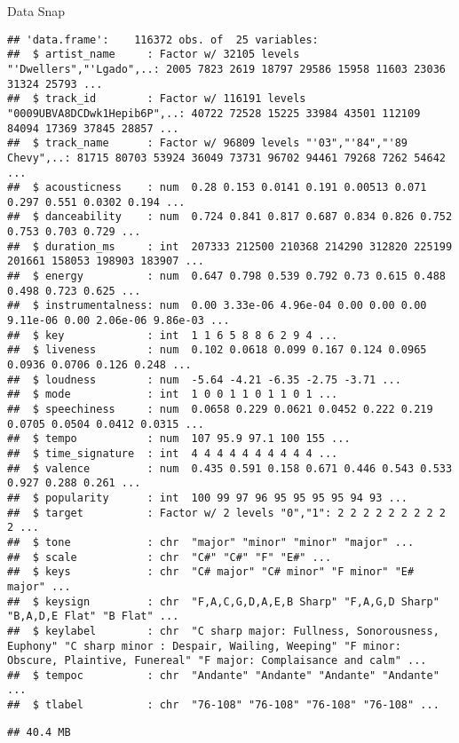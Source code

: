 \documentclass[ignorenonframetext,]{beamer}
\begin{document}
\begin{frame}[fragile]{Data Snap}
\protect\hypertarget{data-snap}{}

\begin{verbatim}
## 'data.frame':    116372 obs. of  25 variables:
##  $ artist_name     : Factor w/ 32105 levels "'Dwellers","'Lgado",..: 2005 7823 2619 18797 29586 15958 11603 23036 31324 25793 ...
##  $ track_id        : Factor w/ 116191 levels "0009UBVA8DCDwk1Hepib6P",..: 40722 72528 15225 33984 43501 112109 84094 17369 37845 28857 ...
##  $ track_name      : Factor w/ 96809 levels "'03","'84","'89 Chevy",..: 81715 80703 53924 36049 73731 96702 94461 79268 7262 54642 ...
##  $ acousticness    : num  0.28 0.153 0.0141 0.191 0.00513 0.071 0.297 0.551 0.0302 0.194 ...
##  $ danceability    : num  0.724 0.841 0.817 0.687 0.834 0.826 0.752 0.753 0.703 0.729 ...
##  $ duration_ms     : int  207333 212500 210368 214290 312820 225199 201661 158053 198903 183907 ...
##  $ energy          : num  0.647 0.798 0.539 0.792 0.73 0.615 0.488 0.498 0.723 0.625 ...
##  $ instrumentalness: num  0.00 3.33e-06 4.96e-04 0.00 0.00 0.00 9.11e-06 0.00 2.06e-06 9.86e-03 ...
##  $ key             : int  1 1 6 5 8 8 6 2 9 4 ...
##  $ liveness        : num  0.102 0.0618 0.099 0.167 0.124 0.0965 0.0936 0.0706 0.126 0.248 ...
##  $ loudness        : num  -5.64 -4.21 -6.35 -2.75 -3.71 ...
##  $ mode            : int  1 0 0 1 1 0 1 1 0 1 ...
##  $ speechiness     : num  0.0658 0.229 0.0621 0.0452 0.222 0.219 0.0705 0.0504 0.0412 0.0315 ...
##  $ tempo           : num  107 95.9 97.1 100 155 ...
##  $ time_signature  : int  4 4 4 4 4 4 4 4 4 4 ...
##  $ valence         : num  0.435 0.591 0.158 0.671 0.446 0.543 0.533 0.927 0.288 0.261 ...
##  $ popularity      : int  100 99 97 96 95 95 95 95 94 93 ...
##  $ target          : Factor w/ 2 levels "0","1": 2 2 2 2 2 2 2 2 2 2 ...
##  $ tone            : chr  "major" "minor" "minor" "major" ...
##  $ scale           : chr  "C#" "C#" "F" "E#" ...
##  $ keys            : chr  "C# major" "C# minor" "F minor" "E# major" ...
##  $ keysign         : chr  "F,A,C,G,D,A,E,B Sharp" "F,A,G,D Sharp" "B,A,D,E Flat" "B Flat" ...
##  $ keylabel        : chr  "C sharp major: Fullness, Sonorousness, Euphony" "C sharp minor : Despair, Wailing, Weeping" "F minor: Obscure, Plaintive, Funereal" "F major: Complaisance and calm" ...
##  $ tempoc          : chr  "Andante" "Andante" "Andante" "Andante" ...
##  $ tlabel          : chr  "76-108" "76-108" "76-108" "76-108" ...
\end{verbatim}

\begin{verbatim}
## 40.4 MB
\end{verbatim}

\end{frame}
\end{document}
